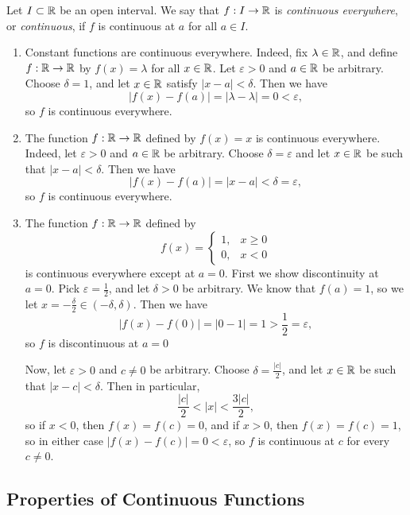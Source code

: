 \documentclass[../analysis1.tex]{subfiles}
\begin{document}
\begin{definition}
    \begin{shaded*}
        Let $I\subset\mathbb{R}$ be an open interval. We say that $f:I\to\mathbb{R}$ is \textit{continuous everywhere}, or \textit{continuous}, if $f$ is continuous at $a$ for all $a\in I$.
    \end{shaded*}
\end{definition}

\begin{example}
\label{ex:basiccontinuityexamples}
    \begin{enumerate}
        \item[1.] Constant functions are continuous everywhere. Indeed, fix $\lambda\in\mathbb{R}$, and define $f:\mathbb{R}\to\mathbb{R}$ by $f(x)=\lambda$ for all $x\in\mathbb{R}$. Let $\varepsilon>0$ and $a\in\mathbb{R}$ be arbitrary. Choose $\delta=1$, and let $x\in\mathbb{R}$ satisfy $|x-a|<\delta$. Then we have \[|f(x)-f(a)|=|\lambda-\lambda|=0<\varepsilon,\]
        so $f$ is continuous everywhere.
        \item[2.] The function $f:\mathbb{R}\to\mathbb{R}$ defined by $f(x)=x$ is continuous everywhere. Indeed, let $\varepsilon>0$ and $a\in\mathbb{R}$ be arbitrary. Choose $\delta=\varepsilon$ and let $x\in\mathbb{R}$ be such that $|x-a|<\delta$. Then we have \[|f(x)-f(a)|=|x-a|<\delta=\varepsilon,\]
        so $f$ is continuous everywhere.
        \item[3.] The function $f:\mathbb{R}\to\mathbb{R}$ defined by \[f(x)=\begin{cases}1,& x\ge 0\\ 0,& x<0\end{cases}\]
        is continuous everywhere except at $a=0$. First we show discontinuity at $a=0$. Pick $\varepsilon=\frac{1}{2}$, and let $\delta>0$ be arbitrary. We know that $f(a)=1$, so we let $x=-\frac{\delta}{2}\in(-\delta,\delta)$. Then we have \[|f(x)-f(0)|=|0-1|=1>\frac{1}{2}=\varepsilon,\]
        so $f$ is discontinuous at $a=0$\par
        Now, let $\varepsilon>0$ and $c\ne 0$ be arbitrary. Choose $\delta=\frac{|c|}{2}$, and let $x\in\mathbb{R}$ be such that $|x-c|<\delta$. Then in particular, \[\frac{|c|}{2}<|x|<\frac{3|c|}{2},\]
        so if $x<0$, then $f(x)=f(c)=0$, and if $x>0$, then $f(x)=f(c)=1$, so in either case $|f(x)-f(c)|=0<\varepsilon$, so $f$ is continuous at $c$ for every $c\ne 0$.
    \end{enumerate}
\end{example}

\subsection{Properties of Continuous Functions}
\end{document}
